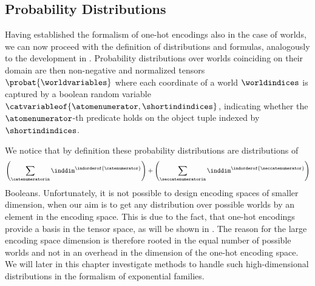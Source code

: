 \subsection{Probability Distributions}

Having established the formalism of one-hot encodings also in the case of \firstOrderLogic{} worlds, we can now proceed with the definition of distributions and formulas, analogously to the development in .
Probability distributions over worlds coinciding on their domain are then non-negative and normalized tensors $\probat{\worldvariables}$ where each coordinate of a world $\worldindices$ is captured by a boolean random variable $\catvariableof{\atomenumerator,\shortindindices}$, indicating whether the $\atomenumerator$-th predicate holds on the object tuple indexed by $\shortindindices$.

We notice that by definition these probability distributions are distributions of
\begin{align*}
    \left(\sum_{\catenumeratorin}\inddim^{\indorderof{\catenumerator}}\right) +  \left(\sum_{\seccatenumeratorin}\inddim^{\indorderof{\seccatenumerator}}\right)
\end{align*}
Booleans.
Unfortunately, it is not possible to design encoding spaces of smaller dimension, when our aim is to get any distribution over possible worlds by an element in the encoding space.
This is due to the fact, that one-hot encodings provide a basis in the tensor space, as will be shown in .
The reason for the large encoding space dimension is therefore rooted in the equal number of possible worlds and not in an overhead in the dimension of the one-hot encoding space.
We will later in this chapter investigate methods to handle such high-dimensional distributions in the formalism of exponential families.



